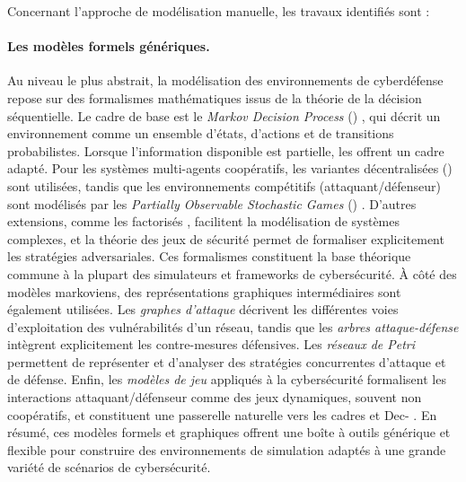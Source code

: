 Concernant l'approche de modélisation manuelle, les travaux identifiés sont :

\paragraph{Les modèles formels génériques.}
Au niveau le plus abstrait, la modélisation des environnements de cyberdéfense repose sur des formalismes mathématiques issus de la théorie de la décision séquentielle. Le cadre de base est le \textit{Markov Decision Process} () \cite{puterman1994mdp}, qui décrit un environnement comme un ensemble d’états, d’actions et de transitions probabilistes. Lorsque l’information disponible est partielle, les  \cite{kaelbling1998pomdp} offrent un cadre adapté. Pour les systèmes multi-agents coopératifs, les variantes décentralisées () \cite{Oliehoek2016} sont utilisées, tandis que les environnements compétitifs (attaquant/défenseur) sont modélisés par les \textit{Partially Observable Stochastic Games} () \cite{hansen2004posg}. D’autres extensions, comme les  factorisés \cite{guestrin2003factored}, facilitent la modélisation de systèmes complexes, et la théorie des jeux de sécurité \cite{manshaei2013game} permet de formaliser explicitement les stratégies adversariales.
Ces formalismes constituent la base théorique commune à la plupart des simulateurs et frameworks de cybersécurité. À côté des modèles markoviens, des représentations graphiques intermédiaires sont également utilisées. Les \textit{graphes d’attaque} \cite{CPhilips1998} décrivent les différentes voies d’exploitation des vulnérabilités d’un réseau, tandis que les \textit{arbres attaque-défense} \cite{BKordy2010} intègrent explicitement les contre-mesures défensives. Les \textit{réseaux de Petri} \cite{MPetty2022,JBland2020,SYamaguchi2020} permettent de représenter et d’analyser des stratégies concurrentes d’attaque et de défense. Enfin, les \textit{modèles de jeu} appliqués à la cybersécurité \cite{MPanfili2018,AAttiah2018,CXiaolin2008} formalisent les interactions attaquant/défenseur comme des jeux dynamiques, souvent non coopératifs, et constituent une passerelle naturelle vers les cadres  et Dec- \cite{beynier2010,terry2020pettingzoo,bernstein2013}.
En résumé, ces modèles formels et graphiques offrent une boîte à outils générique et flexible pour construire des environnements de simulation adaptés à une grande variété de scénarios de cybersécurité.

